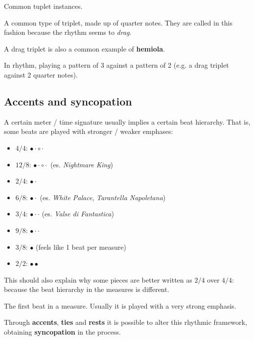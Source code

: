 \begin{definition}
    Common tuplet instances.
\end{definition}

\begin{definition}
    A common type of triplet, made up of quarter notes. They are called in this fashion because the rhythm seems to \emph{drag}.
\end{definition}

A drag triplet is also a common example of \textbf{hemiola}.

\begin{definition}
    In rhythm, playing a pattern of 3 against a pattern of 2 (e.g. a drag triplet against 2 quarter notes).
\end{definition}

\subsection{Accents and syncopation}
A certain meter / time signature usually implies a certain beat hierarchy. That is, some beats are played with stronger / weaker emphases:
\begin{itemize}
    \item $4/4$: $\bullet \cdot \circ \cdot$
    \item $12/8$: $\bullet \cdot \circ \cdot$ (es. \emph{Nightmare King})
    \item $2/4$: $\bullet \cdot$
    \item $6/8$: $\bullet \cdot$ (es. \emph{White Palace}, \emph{Tarantella Napoletana})
    \item $3/4$: $\bullet \cdot \cdot$ (es. \emph{Valse di Fantastica})
    \item $9/8$: $\bullet \cdot \cdot$
    \item $3/8$: $\bullet$ (feels like 1 beat per measure)
    \item $2/2$: $\bullet \bullet$
\end{itemize}

This should also explain why some pieces are better written as $2/4$ over $4/4$: because the beat hierarchy in the measures is different.

\begin{definition}[Downbeat]
    The first beat in a measure. Usually it is played with a very strong emphasis.
\end{definition}

Through \textbf{accents}, \textbf{ties} and \textbf{rests} it is possible to alter this rhythmic framework, obtaining \textbf{syncopation} in the process.

